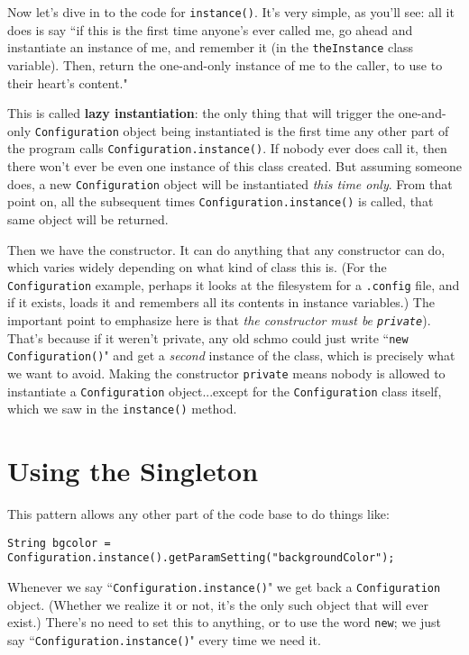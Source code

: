 Now let's dive in to the code for \texttt{instance()}. It's very simple, as
you'll see: all it does is say ``if this is the first time anyone's ever
called me, go ahead and instantiate an instance of me, and remember it (in the
\texttt{theInstance} class variable). Then, return the one-and-only instance
of me to the caller, to use to their heart's content."

This is called \textbf{lazy instantiation}: the only thing that will trigger
the one-and-only \texttt{Configuration} object being instantiated is the first
time any other part of the program calls \texttt{Configuration.instance()}. If
nobody ever does call it, then there won't ever be even one instance of this
class created. But assuming someone does, a new \texttt{Configuration} object
will be instantiated \textit{this time only}. From that point on, all the
subsequent times \texttt{Configuration.instance()} is called, that same object
will be returned.

Then we have the constructor. It can do anything that any constructor can do,
which varies widely depending on what kind of class this is. (For the
\texttt{Configuration} example, perhaps it looks at the filesystem for a
\texttt{.config} file, and if it exists, loads it and remembers all its
contents in instance variables.) The important point to emphasize here is that
\textit{the constructor must be \texttt{private}}). That's because if it
weren't private, any old schmo could just write ``\texttt{new
Configuration()}" and get a \textit{second} instance of the class, which is
precisely what we want to avoid. Making the constructor \texttt{private} means
nobody is allowed to instantiate a \texttt{Configuration} object...except for
the \texttt{Configuration} class itself, which we saw in the
\texttt{instance()} method.


\section{Using the Singleton}

This pattern allows any other part of the code base to do things like:

\begin{Verbatim}[fontsize=\footnotesize,samepage=true,frame=single]
  String bgcolor = Configuration.instance().getParamSetting("backgroundColor");
\end{Verbatim}

Whenever we say ``\texttt{Configuration.instance()}" we get back a
\texttt{Configuration} object. (Whether we realize it or not, it's the only
such object that will ever exist.) There's no need to set this to anything, or
to use the word \texttt{new}; we just say ``\texttt{Configuration.instance()}"
every time we need it.

